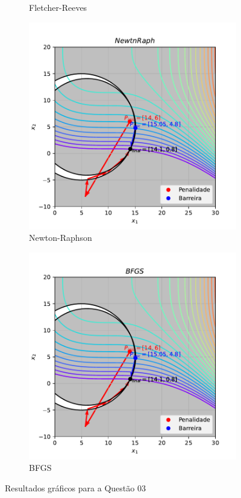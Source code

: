 \documentclass[10pt, a4paper]{article}
\begin{document}
\begin{figure}[htpb]
\begin{subfigure}[b]{0.32\textwidth}
    \caption{Fletcher-Reeves}
    \label{fig:q3_fletchrvs}
  \end{subfigure}
  \hfill
  \begin{subfigure}[b]{0.32\textwidth}
    \centering
    \includegraphics[width=\textwidth]{images/q3_NewtnRaph.pdf}
    \caption{Newton-Raphson}
    \label{fig:q3_newtnraph}
  \end{subfigure}
  \hfill
  \begin{subfigure}[b]{0.32\textwidth}
    \centering
    \includegraphics[width=\textwidth]{images/q3_BFGS.pdf}
    \caption{BFGS}
    \label{fig:q3_bfgs}
  \end{subfigure}
     \caption{Resultados gráficos para a Questão 03}
     \label{fig:q3}
\end{figure}
\end{document}
